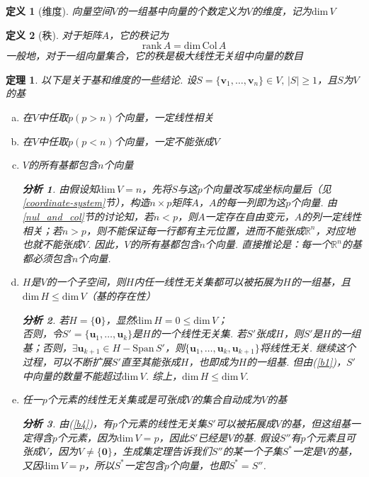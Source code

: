 \documentclass[11pt,UTF8]{ctexart}
\newtheorem{theorem}{定理}
\newtheorem{definition}{定义}
\newtheorem*{analysis}{分析}
\def\vv{\mathbf{v}}
\def\vu{\mathbf{u}}
\def\rn{\mathbb{R}^n}
\def\dim{\mathrm{dim}\,}
\def\span{\mathrm{Span}\,}
\newcommand{\vb}[1]{\mathbf{#1}}
\begin{document}
\begin{definition}[维度]
向量空间$V$的一组基中向量的个数定义为$V$的维度，记为$\dim V$
\end{definition}
\begin{definition}[秩]
对于矩阵$A$，它的秩记为
\[\mathrm{rank}\,A=\mathrm{dim}\,\mathrm{Col}\,A\]
一般地，对于一组向量集合，它的秩是极大线性无关组中向量的数目
\end{definition}
\begin{theorem}以下是关于基和维度的一些结论. 设$S=\{\vv_1,\dots,\vv_n\}\in V,\,|S|\geq 1$，且$S$为$V$的基
\label{basis_theo}
\begin{enumerate}[(a)]
	\itemsep -1pt
	\item \label{b1}在$V$中任取$p(p>n)$个向量，一定线性相关 %
	\item 在$V$中任取$p(p<n)$个向量，一定不能张成$V$%
	\item $V$的所有基都包含$n$个向量
	\begin{analysis}
	由假设知$\dim V=n$，先将$S$与这$p$个向量改写成坐标向量后（见\ref{coordinate-system}节），构造$n\times p$矩阵$A$，$A$的每一列即为这$p$个向量. 由\ref{nul_and_col}节的讨论知，若$n<p$，则$A$一定存在自由变元，$A$的列一定线性相关；若$n>p$，则不能保证每一行都有主元位置，进而不能张成$\rn$，对应地也就不能张成$V$. 因此，$V$的所有基都包含$n$个向量.
	直接推论是：每一个$\mathbb{R}^n$的基都必须包含$n$个向量.
	\end{analysis}
	\item \label{b4}$H$是$V$的一个子空间，则$H$内任一线性无关集都可以被拓展为$H$的一组基，且$\dim H\leq\dim V$（基的存在性）
	\begin{analysis}
	若$H=\{\vb{0}\}$，显然$\dim H=0\leq\dim V$；\\
	否则，令$S'=\{\vu_1,\dots,\vu_k\}$是$H$的一个线性无关集. 若$S'$张成$H$，则$S'$是$H$的一组基；否则，$\exists\vu_{k+1}\in H-\span S'$，则$\{\vu_1,\dots,\vu_k,\vu_{k+1}\}$将线性无关. 继续这个过程，可以不断扩展$S'$直至其能张成$H$，也即成为$H$的一组基. 但由(\ref{b1})，$S'$中向量的数量不能超过$\dim V$. 综上，$\dim H\leq\dim V$.
	\end{analysis}
	\item \label{b5}任一$p$个元素的线性无关集或是可张成$V$的集合自动成为$V$的基
	\begin{analysis}
	由(\ref{b4})，有$p$个元素的线性无关集$S'$可以被拓展成$V$的基，但这组基一定得含$p$个元素，因为$\dim V=p$，因此$S'$已经是$V$的基. 假设$S''$有$p$个元素且可张成$V$，因为$V\ne\{\vb{0}\}$，生成集定理告诉我们$S''$的某一个子集$S^*$一定是$V$的基，又因$\dim V=p$，所以$S^*$一定包含$p$个向量，也即$S^*=S''$.

\end{analysis}
\end{enumerate}
\end{theorem}
\end{document}
